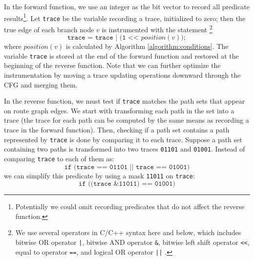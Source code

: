 \documentclass[12pt]{gatech-thesis}
\begin{document}
In the forward function, we use an integer as the bit vector to record all predicate results\footnote{Potentially we could omit recording predicates that do not affect the reverse function.}. 
Let \texttt{trace} be the variable recording a trace, initialized to zero; then the true edge of each branch node $v$ is instrumented with the statement \footnote{We use several operators in C/C++ syntax here and below, which includes bitwise OR operator \texttt{|}, bitwise AND operator \texttt{\&}, bitwise left shift operator  \texttt{<<}, equal to operator \texttt{==}, and logical OR operator \texttt{||} .}
$$ \texttt{trace = trace  | (1 << $\mathit{position(v)}$)}; $$ 
where $\mathit{position(v)}$ is calculated by Algorithm \ref{algorithm:conditions}. 
The variable \texttt{trace} is stored at the end of the forward function and restored at the beginning of the reverse function. 
Note that we can further optimize the instrumentation by moving a trace updating operations downward through the CFG and merging them.



In the reverse function, we must test if \texttt{trace} matches the path sets that appear on route graph edges. We start with transforming each path in the set into a trace (the trace for each path can be computed by the same means as recording a trace in the forward function).
Then, checking if a path set contains a path represented by \texttt{trace} is done by comparing it to each trace. 
Suppose a path set containing two paths is transformed into two traces \texttt{01101} and \texttt{01001}. Instead of comparing \texttt{trace} to each of them as:
$$ \texttt{if (trace == 01101 || trace == 01001)} $$ 
we can simplify this predicate by using a mask \texttt{11011} on \texttt{trace}:
$$ \texttt{if ((trace \& 11011) == 01001)} $$ 
\end{document}
